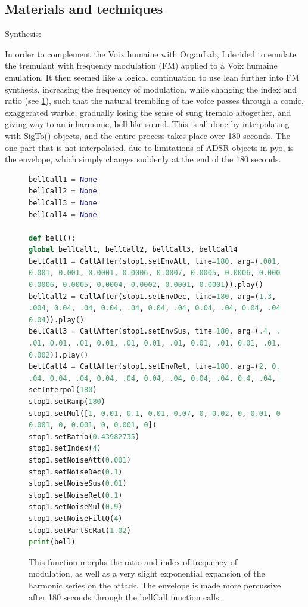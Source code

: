 \documentclass[12pt,twoside,maitrise]{dms_ks}
\theoremstyle{definition}
\begin{document}
{\subsection{Materials and techniques}

Synthesis:

In order to complement the Voix humaine with OrganLab, I decided to emulate the tremulant with frequency modulation (FM) applied to a Voix humaine emulation.  
It then seemed like a logical continuation to use lean further into FM synthesis, increasing the frequency of modulation, while changing the index and ratio (see \cref{fig:fm}), such that the natural trembling of the voice passes through a comic, exaggerated warble, gradually losing the sense of sung tremolo altogether, and giving way to an inharmonic, bell-like sound.  
This is all done by interpolating with SigTo() objects, and the entire process takes place over 180 seconds.  
The one part that is not interpolated, due to limitations of ADSR objects in pyo, is the envelope, which simply changes suddenly at the end of the 180 seconds.

\begin{figure}[H]  
\begin{lstlisting}[language=Python]  
bellCall1 = None  
bellCall2 = None  
bellCall3 = None  
bellCall4 = None

def bell():  
global bellCall1, bellCall2, bellCall3, bellCall4  
bellCall1 = CallAfter(stop1.setEnvAtt, time=180, arg=(.001, .001, .001, .001, 
0.001, 0.001, 0.0001, 0.0006, 0.0007, 0.0005, 0.0006, 0.0003, 0.0005, 0.0003, 
0.0006, 0.0005, 0.0004, 0.0002, 0.0001, 0.0001)).play()  
bellCall2 = CallAfter(stop1.setEnvDec, time=180, arg=(1.3, .05, .02, 0, 0, 0.04, 
.004, 0.04, .04, 0.04, .04, 0.04, .04, 0.04, .04, 0.04, .04, 0.04, .04, 
0.04)).play()  
bellCall3 = CallAfter(stop1.setEnvSus, time=180, arg=(.4, .1, .02, .01, .01, 0.01, 
.01, 0.01, .01, 0.01, .01, 0.01, .01, 0.01, .01, 0.01, .01, 0.01, .002, 
0.002)).play()  
bellCall4 = CallAfter(stop1.setEnvRel, time=180, arg=(2, 0.1, 0.1, .01, .03, 0.4, 
.04, 0.04, .04, 0.04, .04, 0.04, .04, 0.04, .04, 0.4, .04, 0.04, .04, 0.4)).play()  
setInterpol(180)  
stop1.setRamp(180)  
stop1.setMul([1, 0.01, 0.1, 0.01, 0.07, 0, 0.02, 0, 0.01, 0, 0.003, 0, 0.003, 0, 
0.001, 0, 0.001, 0, 0.001, 0])  
stop1.setRatio(0.43982735)  
stop1.setIndex(4)  
stop1.setNoiseAtt(0.001)  
stop1.setNoiseDec(0.1)  
stop1.setNoiseSus(0.01)  
stop1.setNoiseRel(0.1)  
stop1.setNoiseMul(0.9)  
stop1.setNoiseFiltQ(4)  
stop1.setPartScRat(1.02)  
print(bell)  
\end{lstlisting}  
\caption{This function morphs the ratio and index of frequency of modulation, as well as a very slight exponential expansion of the harmonic series on the attack. The envelope is made more percussive after 180 seconds through the bellCall function calls.}  
\label{fig:fm}
\end{figure}

}
\end{document}
